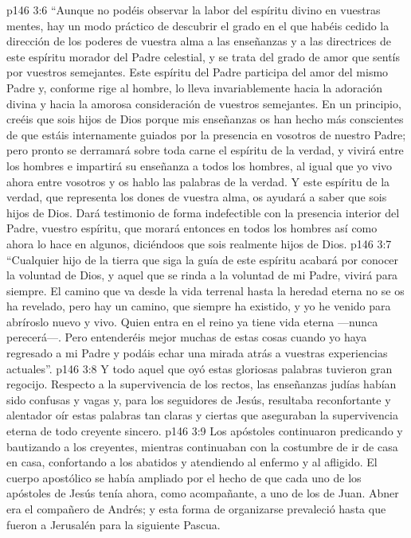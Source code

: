\vs p146 3:6 “Aunque no podéis observar la labor del espíritu divino en vuestras mentes, hay un modo práctico de descubrir el grado en el que habéis cedido la dirección de los poderes de vuestra alma a las enseñanzas y a las directrices de este espíritu morador del Padre celestial, y se trata del grado de amor que sentís por vuestros semejantes. Este espíritu del Padre participa del amor del mismo Padre y, conforme rige al hombre, lo lleva invariablemente hacia la adoración divina y hacia la amorosa consideración de vuestros semejantes. En un principio, creéis que sois hijos de Dios porque mis enseñanzas os han hecho más conscientes de que estáis internamente guiados por la presencia en vosotros de nuestro Padre; pero pronto se derramará sobre toda carne el espíritu de la verdad, y vivirá entre los hombres e impartirá su enseñanza a todos los hombres, al igual que yo vivo ahora entre vosotros y os hablo las palabras de la verdad. Y este espíritu de la verdad, que representa los dones de vuestra alma, os ayudará a saber que sois hijos de Dios. Dará testimonio de forma indefectible con la presencia interior del Padre, vuestro espíritu, que morará entonces en todos los hombres así como ahora lo hace en algunos, diciéndoos que sois realmente hijos de Dios.
\vs p146 3:7 “Cualquier hijo de la tierra que siga la guía de este espíritu acabará por conocer la voluntad de Dios, y aquel que se rinda a la voluntad de mi Padre, vivirá para siempre. El camino que va desde la vida terrenal hasta la heredad eterna no se os ha revelado, pero hay un camino, que siempre ha existido, y yo he venido para abríroslo nuevo y vivo. Quien entra en el reino ya tiene vida eterna ---nunca perecerá---. Pero entenderéis mejor muchas de estas cosas cuando yo haya regresado a mi Padre y podáis echar una mirada atrás a vuestras experiencias actuales”.
\vs p146 3:8 Y todo aquel que oyó estas gloriosas palabras tuvieron gran regocijo. Respecto a la supervivencia de los rectos, las enseñanzas judías habían sido confusas y vagas y, para los seguidores de Jesús, resultaba reconfortante y alentador oír estas palabras tan claras y ciertas que aseguraban la supervivencia eterna de todo creyente sincero.
\vs p146 3:9 \pc Los apóstoles continuaron predicando y bautizando a los creyentes, mientras continuaban con la costumbre de ir de casa en casa, confortando a los abatidos y atendiendo al enfermo y al afligido. El cuerpo apostólico se había ampliado por el hecho de que cada uno de los apóstoles de Jesús tenía ahora, como acompañante, a uno de los de Juan. Abner era el compañero de Andrés; y esta forma de organizarse prevaleció hasta que fueron a Jerusalén para la siguiente Pascua.
